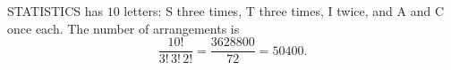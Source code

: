 STATISTICS has $10$ letters: S three times, T three times, I twice, and A and C once each. The number of arrangements is
\[
\dfrac{10!}{3!\,3!\,2!}=\dfrac{3628800}{72}=\boxed{50400}.
\]
